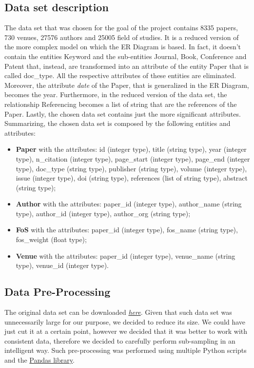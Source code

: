 \documentclass{Configuration_Files/PoliMi3i_thesis}
\begin{document}
\subsection{Data set description}
The data set that was chosen for the goal of the project contains 8335 papers, 730 venues, 27576 authors and 25005 field of studies. It is a reduced version of the more complex model on which the ER Diagram is based. In fact, it doesn't contain the entities Keyword and the sub-entities Journal, Book, Conference and Patent that, instead, are transformed into an attribute of the entity Paper that is called doc\_type. All the respective attributes of these entities are eliminated. Moreover, the attribute \textit{date} of the Paper, that is generalized in the ER Diagram, becomes the year. Furthermore, in the reduced version of the data set, the relationship Referencing becomes a list of string that are the references of the Paper. Lastly, the chosen data set contains just the more significant attributes. 
Summarizing, the chosen data set is composed by the following entities and attributes:
\begin{itemize}
    \item \textbf{Paper} with the attributes: id (integer type), title (string type), year (integer type), n\_citation (integer type), page\_start (integer type), page\_end (integer type), doc\_type (string type), publisher (string type), volume (integer type), issue (integer type), doi (string type), references (list of string type), abstract (string type);
    \item \textbf{Author} with the attributes: paper\_id (integer type), author\_name (string type), author\_id (integer type), author\_org (string type);
    \item \textbf{FoS} with the attributes: paper\_id (integer type), fos\_name (string type), fos\_weight (float type);
    \item \textbf{Venue} with the attributes: paper\_id (integer type), venue\_name (string type), venue\_id (integer type).
\end{itemize}
\subsection{Data Pre-Processing}
The original data set can be downloaded \href{https://lfs.aminer.cn/misc/dblp.v11.zip}{\textit{here}}. 
Given that such data set was unnecessarily large for our purpose, we decided to reduce its size. We could have just cut it at a certain point, however we decided that it was better to work with consistent data, therefore we decided to carefully perform sub-sampling in an intelligent way. Such pre-processing was performed using multiple Python scripts and the \href{https://pandas.pydata.org/}{Pandas library}. 
\end{document}
